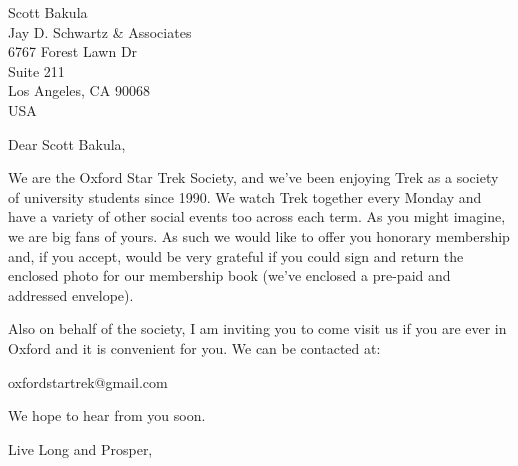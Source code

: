 \documentclass[
  fontsize=11pt,
  paper=a4,
  parskip=half,
  enlargefirstpage=on,    
  fromalign=right,        
  fromphone=off,           
  addrfield=on,           
  backaddress=off,         
  subject=beforeopening,  
  locfield=narrow,        
  foldmarks=on,           
]{scrlttr2}
\begin{document}
  
\begin{letter}{
    \LARGE{Scott Bakula} \\
    Jay D. Schwartz \& Associates \\
    6767 Forest Lawn Dr \\
    Suite 211 \\
    Los Angeles, CA 90068 \\
    USA
}
    
    
\opening{Dear Scott Bakula,}

We are the Oxford Star Trek Society, and we've been enjoying Trek as a
society of university students since 1990. We watch Trek together
every Monday and have a variety of other social events too across each
term. As you might imagine, we are big fans of yours. As such we would
like to offer you honorary membership and, if you accept, would be
very grateful if you could sign and return the enclosed photo for our
membership book (we've enclosed a pre-paid and addressed envelope).

Also on behalf of the society, I am inviting you to come visit us if
you are ever in Oxford and it is convenient for you. We can be
contacted at:

{\large oxfordstartrek@gmail.com}

We hope to hear from you soon.

\closing{Live Long and Prosper,}
  
\end{letter}
\end{document}
